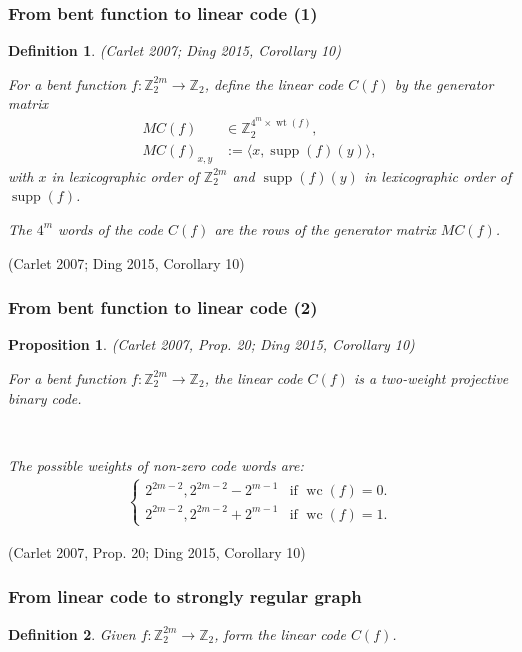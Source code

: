 \documentclass[pdf,sprung,slideColor,nocolorBG]{beamer}
\newenvironment{colortheme}[1]{
\def\ProvidesPackageRCS $##1${\relax}
\renewcommand{\ProcessOptions}{\relax}
\makeatletter

\makeatother
}{}
\newcommand{\slidecite}[1]{\tiny{(#1)}\normalsize{}}
\newcommand{\smallcite}[1]{\small{(#1)}\normalsize{}}
\newcommand{\mb}[1]{\mathbb{#1}}
\newcommand{\To}{\rightarrow}
\newcommand{\support}[1]{\operatorname{supp}\left(#1\right)}
\newcommand{\weight}[1]{\operatorname{wt}\left(#1\right)}
\newcommand{\weightclass}[1]{\operatorname{wc}\left(#1\right)}
\newcommand{\Z}{\mb{Z}}
\newtheorem{Def}{Definition}
\newtheorem{Proposition}{Proposition}
\begin{document}
\begin{colortheme}{seagull}
\begin{frame}
\frametitle{From bent function to linear code (1)}
\begin{Def}

\smallcite{Carlet 2007; Ding 2015, Corollary 10}

For a bent function $f : \Z_2^{2m} \To \Z_2$,
define the linear code $C(f)$ by the generator matrix
\begin{align*}
M C(f) &\in \Z_2^{4^m \times \weight{f}},
\\
M C(f)_{x,y} &:= \langle x, \support{f}(y) \rangle,
\end{align*}
with $x$ in lexicographic order of $\Z_2^{2m}$
and $\support{f}(y)$ in lexicographic order of $\support{f}$.

The $4^m$ words of the code $C(f)$ are the rows of the generator matrix $M C(f)$.
\end{Def}

\slidecite{Carlet 2007; Ding 2015, Corollary 10}

\end{frame}
\begin{frame}
\frametitle{From bent function to linear code (2)}
\begin{Proposition}
\smallcite{Carlet 2007, Prop. 20; Ding 2015, Corollary 10}

For a bent function $f : \Z_2^{2m} \To \Z_2$, the linear code $C(f)$
is a two-weight projective binary code.

~

The possible weights of non-zero code words are:
\begin{align*}
\begin{cases}
2^{2m-2}, 2^{2m-2} - 2^{m-1} & \text{if~} \weightclass{f}=0.
\\
2^{2m-2}, 2^{2m-2} + 2^{m-1} & \text{if~} \weightclass{f}=1.
\end{cases}
\end{align*}

\end{Proposition}

\slidecite{Carlet 2007, Prop. 20; Ding 2015, Corollary 10}

\end{frame}
\begin{frame}
\frametitle{From linear code to strongly regular graph}
\begin{Def}
\label{R-f-def}
Given $f : \Z_2^{2m} \To \Z_2$, form the linear code $C(f)$.


\end{Def}
\end{frame}
\end{colortheme}
\end{document}
